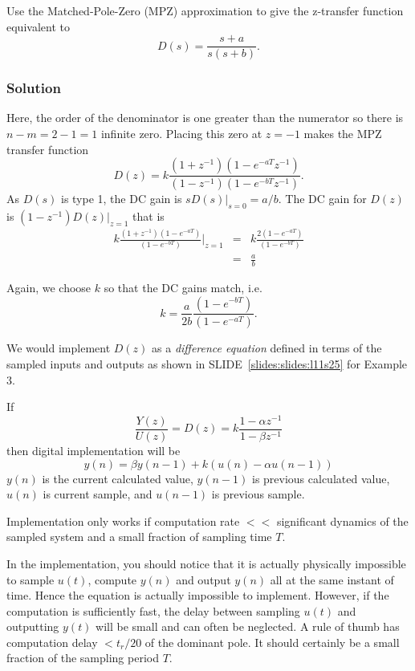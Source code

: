 \begin{slide}

Use the Matched-Pole-Zero (MPZ) approximation to give the z-transfer function equivalent to
$$D(s)=\frac{s+a}{s(s+b)}.$$
\end{slide}

\subsubsection*{Solution}
Here, the order of the denominator is one greater than the numerator so there is
$n-m = 2 - 1 = 1$ infinite zero. Placing this zero at $z = -1$ makes the MPZ transfer
function
$$D(z)=k\frac{(1+z^{-1})(1-e^{-aT}z^{-1})}{(1-z^{-1})(1 - e^{-bT}z^{-1})}.$$
As $D(s)$ is type 1, the DC gain is $sD(s)|_{s=0} = a/b$.
The DC gain for $D(z)$ is $(1-z^{-1})D(z)|_{z=1}$ that is
\begin{eqnarray*}
k\frac{(1+z^{-1})(1-e^{-aT})}{(1-e^{-bT})}|_{z=1} & = & k\frac{2(1-e^{-aT})}{(1-e^{-bT})} \\
        & = & \frac{a}{b}
\end{eqnarray*}

Again, we choose $k$ so that the DC gains match, i.e.
$$k = \frac{a}{2b}\frac{(1-e^{-bT})}{(1-e^{-aT})}.$$

We would implement $D(z)$ as a \emph{difference equation} defined in terms of the
sampled inputs and outputs as shown in SLIDE~\ref{slides:slides:l11s25} for Example 3.
\begin{slide}\label{slides:l11s25}
	If $$\frac{Y(z)}{U(z)}=D(z)=k\frac{1-\alpha z^{-1}}{1-\beta z^{-1}}$$ then digital implementation will be
	$$y(n)=\beta y(n-1)+k(u(n)-\alpha u(n-1))$$
	$y(n)$ is the current calculated value, $y(n-1)$ is previous calculated value, $u(n)$ is current sample, and $u(n-1)$ is previous sample.

	Implementation only works if computation rate $<<$ significant dynamics of the sampled system and a small fraction of sampling time $T$.
\end{slide}

In the implementation, you should notice that it is actually physically impossible
to sample $u(t)$, compute $y(n)$ and output $y(n)$ all at the same instant of time.
Hence the equation is actually impossible to implement. However, if the
computation is sufficiently fast, the delay between sampling $u(t)$ and outputting
$y(t)$ will be small and can often be neglected.
A rule of thumb has computation delay $< t_r/20$ of the dominant pole.
It should certainly be a small fraction of the sampling period $T$.

